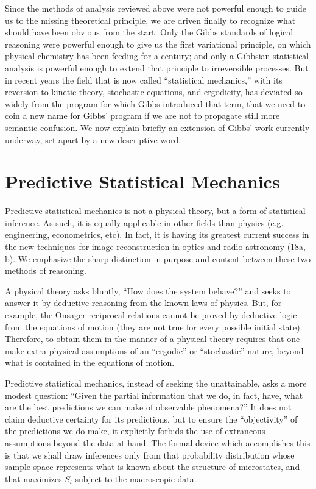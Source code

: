 \documentclass{article}
\begin{document}
Since the methods of analysis reviewed above were not powerful enough to guide us to the missing theoretical principle, we are driven finally to recognize what should have been obvious from the start. Only the Gibbs standards of logical reasoning were powerful enough to give us the first variational principle, on which physical chemistry has been feeding for a century; and only a Gibbsian statistical analysis is powerful enough to extend that principle to irreversible processes. But in recent years the field that is now called ``statistical mechanics,'' with its reversion to kinetic theory, stochastic equations, and ergodicity, has deviated so widely from the program for which Gibbs introduced that term, that we need to coin a new name for Gibbs' program if we are not to propagate still more semantic confusion. We now explain briefly an extension of Gibbs' work currently underway, set apart by a new descriptive word.

\section{Predictive Statistical Mechanics}

Predictive statistical mechanics is not a physical theory, but a form of statistical inference. As such, it is equally applicable in other fields than physics (e.g. engineering, econometrics, etc). In fact, it is having its greatest current success in the new techniques for image reconstruction in optics and radio astronomy (18a, b). We emphasize the sharp distinction in purpose and content between these two methods of reasoning.

A physical theory asks bluntly, ``How does the system behave?'' and seeks to answer it by deductive reasoning from the known laws of physics. But, for example, the Onsager reciprocal relations cannot be proved by deductive logic from the equations of motion (they are not true for every possible initial state). Therefore, to obtain them in the manner of a physical theory requires that one make extra physical assumptions of an ``ergodic'' or ``stochastic'' nature, beyond what is contained in the equations of motion.

Predictive statistical mechanics, instead of seeking the unattainable, asks a more modest question: ``Given the partial information that we do, in fact, have, what are the best predictions we can make of observable phenomena?'' It does not claim deductive certainty for its predictions, but to ensure the ``objectivity'' of the predictions we do make, it explicitly forbids the use of extrancous assumptions beyond the data at hand. The formal device which accomplishes this is that we shall draw inferences only from that probability distribution whose sample space represents what is known about the structure of microstates, and that maximizes $S_l$ subject to the macroscopic data.
\end{document}

